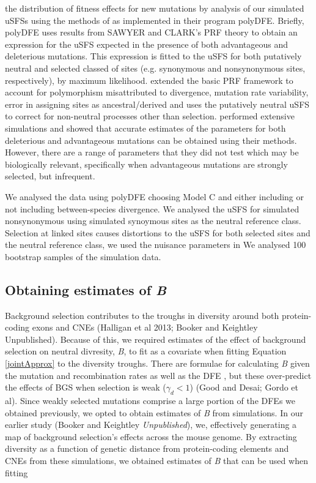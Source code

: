 \documentclass[11pt]{article}
\begin{document}
	
	 the distribution of fitness effects for new mutations by analysis of our simulated uSFSs using the methods of \cite{RN354} as implemented in their program polyDFE. Briefly, polyDFE uses results from SAWYER and CLARK's PRF theory to obtain an expression for the uSFS expected in the presence of both advantageous and deleterious mutations. This expression is fitted to the uSFS for both putatively neutral and selected classed of sites (e.g. synonymous and nonsynonymous sites, respectively), by maximum likelihood. \cite{RN354} extended the basic PRF framework to account for polymorphism misattributed to divergence, mutation rate variability, error in assigning sites as ancestral/derived and uses the putatively neutral uSFS to correct for non-neutral processes other than selection. \cite{RN354} performed extensive simulations and showed that accurate estimates of the parameters for both deleterious and advantageous mutations can be obtained using their methods. However, there are a range of parameters that they did not test which may be biologically relevant, specifically when advantageous mutations are strongly selected, but infrequent.

	 We analysed the data using polyDFE choosing Model C and either including or not including between-species divergence. We analysed the uSFS for simulated nonsynonymous using simulated synoymous sites as the neutral reference class. Selection at linked sites causes distortions to the uSFS for both selected sites and the neutral reference class, we used the nuisance parameters in 
	 We analysed 100 bootstrap samples of the simulation data.
 
	\subsection*{Obtaining estimates of \textit{B}} 
 
 	Background selection contributes to the troughs in diversity around both protein-coding exons and CNEs (Halligan et al 2013; Booker and Keightley Unpublished). Because of this, we required estimates of the effect of background selection on neutral divresity, \textit{B}, to fit as a covariate when fitting Equation \ref{jointApprox} to the diversity troughs. There are formulae for calculating \textit{B} given the mutation and recombination rates as well as the DFE \citep{RN157, RN206}, but these over-predict the effects of BGS when selection is weak ($\gamma_d < 1$) (Good and Desai; Gordo et al). Since weakly selected mutations comprise a large portion of the DFEs we obtained previously, we opted to obtain estimates of \textit{B} from simulations. In our earlier study (Booker and Keightley \textit{Unpublished}), we, effectively generating a map of background selection's effects across the mouse genome. By extracting diversity as a function of genetic distance from protein-coding elements and CNEs from these simulations, we obtained estimates of \textit{B} that can be used when fitting 
 	
\end{document}
